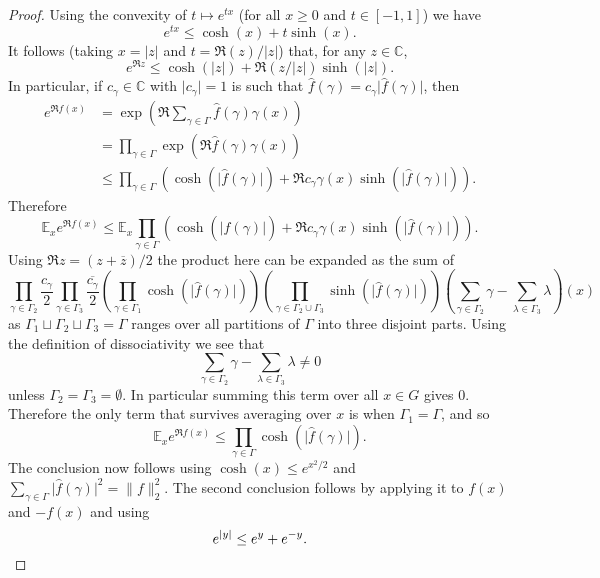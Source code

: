 \begin{proof}
\leanok
Using the convexity of $t\mapsto e^{tx}$ (for all $x\geq 0$ and $t\in[-1,1]$) we have
\[e^{tx}\leq \cosh(x)+t\sinh(x).\]
It follows (taking $x=\lvert z\rvert$ and $t=\Re(z)/\lvert z\rvert$) that, for any $z\in \mathbb{C}$,
\[e^{\Re z}\leq \cosh(\lvert z\rvert)+\Re(z/\lvert z\rvert)\sinh(\lvert z\rvert).\]
In particular, if $c_\gamma\in \mathbb{C}$ with $\lvert c_\gamma\rvert=1$ is such that $\widehat{f}(\gamma)=c_\gamma\lvert \widehat{f}(\gamma)\rvert$, then
\begin{align*}
e^{\Re f(x)}
&= \exp\left( \Re \sum_{\gamma\in\Gamma}\widehat{f}(\gamma)\gamma(x)\right)\\
&=\prod_{\gamma\in \Gamma} \exp\left( \Re \widehat{f}(\gamma)\gamma(x)\right)\\
&\leq \prod_{\gamma\in \Gamma}\left( \cosh(\lvert \widehat{f}(\gamma)\rvert)+\Re c_\gamma \gamma(x)\sinh(\lvert \widehat{f}(\gamma)\rvert)\right).
\end{align*}
Therefore
\[\mathbb{E}_x e^{\Re f(x)}\leq \mathbb{E}_x \prod_{\gamma\in \Gamma} \left( \cosh(\lvert \widehat{f}(\gamma)\rvert)+\Re c_\gamma \gamma(x)\sinh(\lvert \widehat{f}(\gamma)\rvert)\right).\]
Using $\Re z=(z+\overline{z})/2$ the product here can be expanded as the sum of
\[\prod_{\gamma\in \Gamma_2}\frac{c_\gamma}{2}\prod_{\gamma\in \Gamma_3}\frac{\overline{c_\gamma}}{2}\left(\prod_{\gamma\in \Gamma_1}\cosh(\lvert \widehat{f}(\gamma)\rvert)\right)\left(\prod_{\gamma\in \Gamma_2\cup\Gamma_3}\sinh(\lvert \widehat{f}(\gamma)\rvert)\right)\left(\sum_{\gamma\in \Gamma_2}\gamma-\sum_{\lambda\in \Gamma_3}\lambda\right)(x)\]
as $\Gamma_1\sqcup \Gamma_2\sqcup \Gamma_3=\Gamma$ ranges over all partitions of $\Gamma$ into three disjoint parts. Using the definition of dissociativity we see that
\[\sum_{\gamma\in \Gamma_2}\gamma-\sum_{\lambda\in \Gamma_3}\lambda\neq 0\]
unless $\Gamma_2=\Gamma_3=\emptyset$. In particular summing this term over all $x\in G$ gives $0$. Therefore the only term that survives averaging over $x$ is when $\Gamma_1=\Gamma$, and so
\[\mathbb{E}_x e^{\Re f(x)}\leq \prod_{\gamma\in \Gamma} \cosh (\lvert \widehat{f}(\gamma)\rvert).\]
The conclusion now follows using $\cosh(x) \leq e^{x^2/2}$ and $\sum_{\gamma\in \Gamma}\lvert \widehat{f}(\gamma)\rvert^2=\| f\|_2^2$. The second conclusion follows by applying it to $f(x)$ and $-f(x)$ and using
\[e^{\left\lvert y\right\rvert}\leq e^y+e^{-y}.\]
\end{proof}


